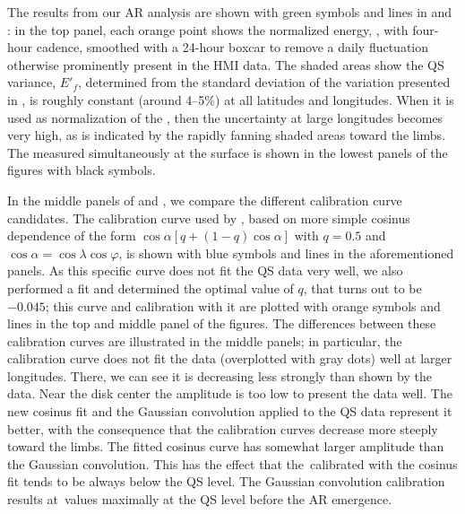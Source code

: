 \documentclass{aa}
\begin{document}
The results from our AR analysis are shown with green symbols and lines in  and : in the top panel, each orange point shows the normalized \fff energy, \eft, with four-hour cadence, 
smoothed with a 24-hour boxcar to remove a daily fluctuation
otherwise prominently present in the HMI data. The shaded areas show the QS variance, $E'_f$,
determined from the standard deviation of the variation presented in ,
is roughly constant (around 4--5\%) at all latitudes and longitudes. When it is used as normalization of the \fffns, then the uncertainty at large longitudes becomes very high, as is indicated by the rapidly 
fanning 
shaded areas toward the limbs. The \brms{} measured simultaneously at the surface is shown in the lowest panels of the figures with black symbols. 

In the middle panels of  and , we compare the different calibration curve candidates.
The calibration curve used by 
\cite{SRB16},
based on more simple cosinus dependence of the form $\cos{\alpha} \left[q + \left(1-q \right) \cos{\alpha} \right]$ with $q=0.5$
and $\cos\alpha = \cos\lambda \cos\varphi$, is shown with blue symbols and lines in the aforementioned panels.
As this specific curve does not fit the QS data very well, we also performed a fit and determined the optimal value of $q$, that turns out to be $-0.045$; this curve and calibration with it are plotted with orange symbols and lines in the top and middle panel of the figures.
The differences between these calibration curves are illustrated in the middle panels; in particular, the \cite{SRB16} calibration
curve does not fit the data (overplotted with gray dots) well at larger longitudes. There, we can see it 
is decreasing less strongly
than shown by the data. Near the disk center the amplitude is too low to present the data well.
The new cosinus fit and the Gaussian convolution applied to the QS
data represent it better, with the consequence that the calibration curves decrease more steeply toward the limbs.
The fitted cosinus curve has somewhat larger amplitude than the Gaussian convolution. This has the effect that the \eft\,calibrated
with the cosinus fit tends to be always below the QS level. The Gaussian convolution calibration results at \eft\,values maximally at the QS level before the AR emergence.
\end{document}
